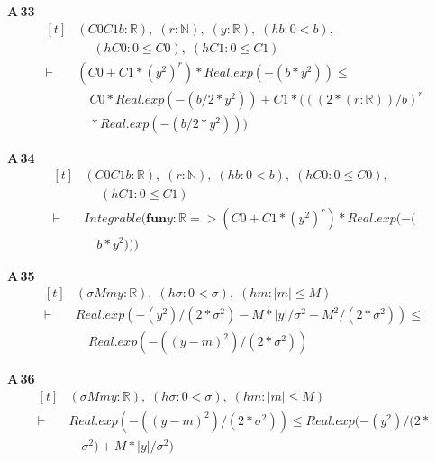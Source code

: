 \noindent\textbf{A\,33}\quad{}
{\footnotesize\[ \begin{aligned}[t]
&(\mathit{C0} \mathit{C1} \mathit{b} : \mathbb{R} ),\; (\mathit{r} : \mathbb{N} ),\; (\mathit{y} : \mathbb{R} ),\; (\mathit{hb} : 0 < \mathit{b}),\\
&\quad \; (\mathit{hC0} : 0 \leq \mathit{C0}),\; (\mathit{hC1} : 0 \leq \mathit{C1})\\
\vdash\;&(\mathit{C0} + \mathit{C1} * (\mathit{y} ^{2}) ^{\mathit{r}}) * \mathit{Real}.\mathit{exp} (-(\mathit{b} * \mathit{y} ^{2})) \leq\\
&\quad \mathit{C0} * \mathit{Real}.\mathit{exp} (-(\mathit{b} / 2 * \mathit{y} ^{2})) + \mathit{C1} * (((2 * (\mathit{r} : \mathbb{R} )) / \mathit{b}) ^{\mathit{r}}\\
&\quad * \mathit{Real}.\mathit{exp} (-(\mathit{b} / 2 * \mathit{y} ^{2})))
\end{aligned} \]}

\noindent\textbf{A\,34}\quad{}
{\footnotesize\[ \begin{aligned}[t]
&(\mathit{C0} \mathit{C1} \mathit{b} : \mathbb{R} ),\; (\mathit{r} : \mathbb{N} ),\; (\mathit{hb} : 0 < \mathit{b}),\; (\mathit{hC0} : 0 \leq \mathit{C0}),\\
&\quad \; (\mathit{hC1} : 0 \leq \mathit{C1})\\
\vdash\;&\mathit{Integrable} (\mathbf{fun} \mathit{y} : \mathbb{R} => (\mathit{C0} + \mathit{C1} * (\mathit{y} ^{2}) ^{\mathit{r}}) * \mathit{Real}.\mathit{exp} (-(\\
&\quad \mathit{b} * \mathit{y} ^{2})))
\end{aligned} \]}

\noindent\textbf{A\,35}\quad{}
{\footnotesize\[ \begin{aligned}[t]
&(\sigma \mathit{M} \mathit{m} \mathit{y} : \mathbb{R} ),\; (\mathit{hσ} : 0 < \sigma ),\; (\mathit{hm} : |\mathit{m}| \leq \mathit{M})\\
\vdash\;&\mathit{Real}.\mathit{exp} (-(\mathit{y} ^{2}) / (2 * \sigma ^{2}) - \mathit{M} * |\mathit{y}| / \sigma ^{2} - \mathit{M} ^{2} / (2 * \sigma ^{2})) \leq\\
&\quad \mathit{Real}.\mathit{exp} (-((\mathit{y} - \mathit{m}) ^{2}) / (2 * \sigma ^{2}))
\end{aligned} \]}

\noindent\textbf{A\,36}\quad{}
{\footnotesize\[ \begin{aligned}[t]
&(\sigma \mathit{M} \mathit{m} \mathit{y} : \mathbb{R} ),\; (\mathit{hσ} : 0 < \sigma ),\; (\mathit{hm} : |\mathit{m}| \leq \mathit{M})\\
\vdash\;&\mathit{Real}.\mathit{exp} (-((\mathit{y} - \mathit{m}) ^{2}) / (2 * \sigma ^{2})) \leq \mathit{Real}.\mathit{exp} (-(\mathit{y} ^{2}) / (2 *\\
&\quad \sigma ^{2}) + \mathit{M} * |\mathit{y}| / \sigma ^{2})
\end{aligned} \]}

